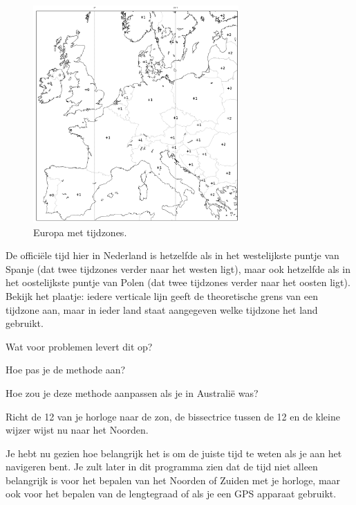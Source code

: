 \begin{figure}
    \centering
    \includegraphics[width=0.7\textwidth]{europe_timezone_plus.png}
    \caption{Europa met tijdzones.}
\end{figure}

\begin{opgave}
    De offici\"ele tijd hier in Nederland is hetzelfde als in het westelijkste puntje van Spanje (dat twee tijdzones verder naar het westen ligt), maar ook hetzelfde als in het oostelijkste puntje van Polen (dat twee tijdzones verder naar het oosten ligt). Bekijk het plaatje: iedere verticale lijn geeft de theoretische grens van een tijdzone aan, maar in ieder land staat aangegeven welke tijdzone het land gebruikt. 
    \begin{subopgave}
        Wat voor problemen levert dit op?
    \end{subopgave}
    \begin{subopgave}[\ster]
        Hoe pas je de methode aan?
    \end{subopgave}
\end{opgave}

\begin{opgave}
    Hoe zou je deze methode aanpassen als je in Australi\"{e} was?
    \begin{antwoord}
        Richt de 12 van je horloge naar de zon, de bissectrice tussen de 12 en de kleine wijzer wijst nu naar het Noorden.
    \end{antwoord}
\end{opgave}

Je hebt nu gezien hoe belangrijk het is om de juiste tijd te weten als je aan het navigeren bent. Je zult later in dit programma zien dat de tijd niet alleen belangrijk is voor het bepalen van het Noorden of Zuiden met je horloge, maar ook voor het bepalen van de lengtegraad of als je een GPS apparaat gebruikt.
